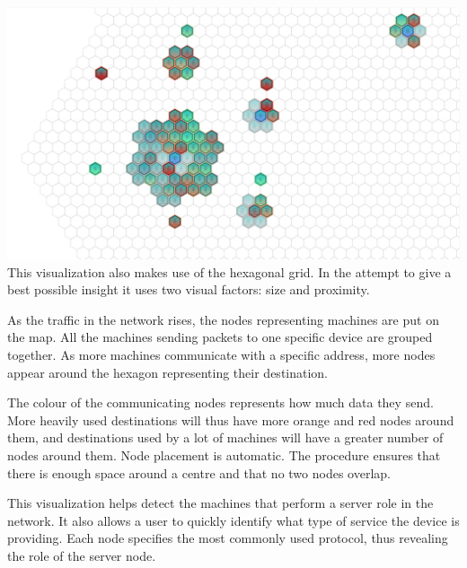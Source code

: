 \includegraphics[width=\linewidth]{materials/groups.jpg}
This visualization also makes use of the hexagonal grid. In the attempt to give
a best possible insight it uses two visual factors: size and proximity.

As the traffic in the network rises, the nodes representing machines are put on
the map. All the machines sending packets to one specific device are grouped
together. As more machines communicate with a specific address, more nodes
appear around the hexagon representing their destination.

The colour of the communicating nodes represents how much data they send. More
heavily used destinations will thus have more orange and red nodes around them,
and destinations used by a lot of machines will have a greater number of nodes
around them. Node placement is automatic. The procedure ensures that there is
enough space around a centre and that no two nodes overlap.

This visualization helps detect the machines that perform a server role in the
network. It also allows a user to quickly identify what type of service the device
is providing. Each node specifies the most commonly used protocol, thus
revealing the role of the server node.

